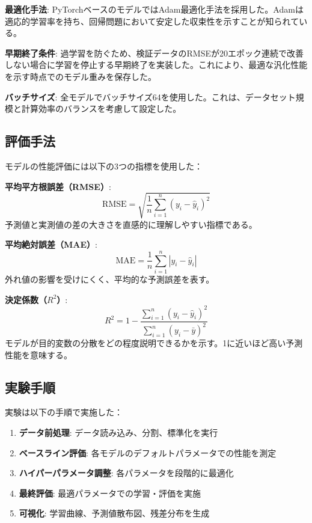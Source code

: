 \documentclass[12pt,a4paper,dvipdfmx]{jsarticle}
\begin{document}
\textbf{最適化手法}: PyTorchベースのモデルではAdam最適化手法を採用した。Adamは適応的学習率を持ち、回帰問題において安定した収束性を示すことが知られている。

\textbf{早期終了条件}: 過学習を防ぐため、検証データのRMSEが20エポック連続で改善しない場合に学習を停止する早期終了を実装した。これにより、最適な汎化性能を示す時点でのモデル重みを保存した。

\textbf{バッチサイズ}: 全モデルでバッチサイズ64を使用した。これは、データセット規模と計算効率のバランスを考慮して設定した。

\subsection{評価手法}

モデルの性能評価には以下の3つの指標を使用した：

\textbf{平均平方根誤差（RMSE）}: 
\begin{equation}
    \text{RMSE} = \sqrt{\frac{1}{n} \sum_{i=1}^{n}(y_i - \hat{y}_i)^2}
\end{equation}
予測値と実測値の差の大きさを直感的に理解しやすい指標である。

\textbf{平均絶対誤差（MAE）}: 
\begin{equation}
    \text{MAE} = \frac{1}{n} \sum_{i=1}^{n}|y_i - \hat{y}_i|
\end{equation}
外れ値の影響を受けにくく、平均的な予測誤差を表す。

\textbf{決定係数（$R^2$）}: 
\begin{equation}
    R^2 = 1 - \frac{\sum_{i=1}^{n}(y_i - \hat{y}_i)^2}{\sum_{i=1}^{n}(y_i - \bar{y})^2}
\end{equation}
モデルが目的変数の分散をどの程度説明できるかを示す。1に近いほど高い予測性能を意味する。

\subsection{実験手順}

実験は以下の手順で実施した：

\begin{enumerate}
    \item \textbf{データ前処理}: データ読み込み、分割、標準化を実行
    \item \textbf{ベースライン評価}: 各モデルのデフォルトパラメータでの性能を測定
    \item \textbf{ハイパーパラメータ調整}: 各パラメータを段階的に最適化
    \item \textbf{最終評価}: 最適パラメータでの学習・評価を実施
    \item \textbf{可視化}: 学習曲線、予測値散布図、残差分布を生成
\end{enumerate}
\end{document}

